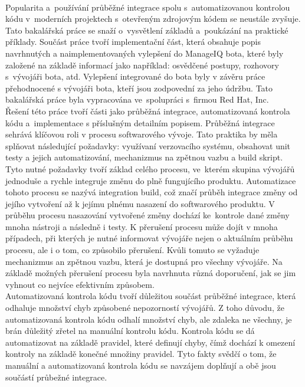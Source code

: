 \\
Popularita a~používání průběžné integrace spolu s~automatizovanou kontrolou kódu v~mo\-derních projektech s~otevřeným zdrojovým kódem se neustále zvyšuje. Tato bakalářská práce se snaží o~vysvětlení základů a~poukázání na praktické příklady. Součást práce tvoří implementační část, která obsahuje popis navrhnutých a naimplementovaných vylepšení do ManageIQ bota, které byly založené na základě informací jako například: osvědčené postupy, rozhovory s~vývojáři bota, atd. Vylepšení integrované do bota byly v závěru práce přehodnocené s vývojáři bota, kteří jsou zodpovední za jeho údržbu. Tato bakalářská práce byla vypracována ve~spolupráci s~firmou Red Hat, Inc.\\[0.5em]
\indent Řešení této práce tvoří části jako průběžná integrace, automatizovaná kontrola kódu a~implementace s příslušným detailním popisem. Průběžná integrace sehrává klíčovou roli v procesu softwarového vývoje. Tato praktika by měla splňovat následující požadavky: využívaní verzovacího systému, obsahovat unit testy a jejich automatizování, mechanizmus na zpětnou vazbu a build skript. Tyto nutné požadavky tvoří základ celého procesu, ve~kterém skupina vývojářů jednoduše a rychle integruje změnu do plně fungujícího produktu. Automatizace tohoto procesu se nazývá integration build, což značí průběh integrace změny od jejího vytvoření až k jejímu plnému nasazení do softwarového produktu. V průběhu procesu nasazování vytvořené změny dochází ke~kontrole dané změny mnoha nástroji a následně i testy. K přerušení procesu může dojít v mnoha případech, při kterých je nutné informovat vývojáře nejen o aktuálním průběhu procesu, ale i o tom, co způsobilo přerušení. Kvůli tomuto se vyžaduje mechanizmus an zpětnou vazbu, která je dostupná pro všechny vývojáře. Na základě možných přerušení procesu byla navrhnuta různá doporučení, jak se jim vyhnout co nejvíce efektivním způsobem.\\[0.5em]
\indent Automatizovaná kontrola kódu tvoří důležitou součást průběžné integrace, která odhaluje množství chyb způsobené nepozorností vývojářů. Z toho důvodu, že automatizovaná kontrola kódu odhalí množství chyb, ale zdaleka ne všechny, je brán důležitý zřetel na manuální kontrolu kódu. Kontrola kódu se dá automatizovat na základě pravidel, které definují chyby, čímž dochází k omezení kontroly na základě konečné množiny pravidel. Tyto fakty svědčí o tom, že manuální a automatizovaná kontrola kódu se navzájem doplňují a obě jsou součástí průbežné integrace.\\[0.5em]
